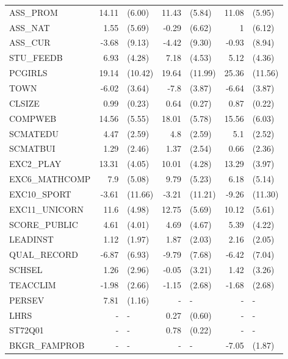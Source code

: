 \documentclass[10pt]{article}
\begin{document}
\begin{table}[H]
\begin{threeparttable}
\begin{tabular}{lrlrlrl}
				ASS\_PROM & 14.11 & (6.00) & 11.43 & (5.84) & 11.08 & (5.95) \\[0.2em]
				ASS\_NAT & 1.55  & (5.69) & -0.29 & (6.62) & 1     & (6.12) \\[0.2em]
				ASS\_CUR & -3.68 & (9.13) & -4.42 & (9.30) & -0.93 & (8.94) \\[0.2em]
				STU\_FEEDB & 6.93  & (4.28) & 7.18  & (4.53) & 5.12  & (4.36) \\[0.2em]
				PCGIRLS & 19.14 & (10.42) & 19.64 & (11.99) & 25.36 & (11.56) \\[0.2em]
				TOWN  & -6.02 & (3.64) & -7.8  & (3.87) & -6.64 & (3.87) \\[0.2em]
				CLSIZE & 0.99  & (0.23) & 0.64  & (0.27) & 0.87  & (0.22) \\[0.2em]
				COMPWEB & 14.56 & (5.55) & 18.01 & (5.78) & 15.56 & (6.03) \\[0.2em]
				SCMATEDU & 4.47  & (2.59) & 4.8   & (2.59) & 5.1   & (2.52) \\[0.2em]
				SCMATBUI & 1.29  & (2.46) & 1.37  & (2.54) & 0.66  & (2.36) \\[0.2em]
				EXC2\_PLAY & 13.31 & (4.05) & 10.01 & (4.28) & 13.29 & (3.97) \\[0.2em]
				EXC6\_MATHCOMP & 7.9   & (5.08) & 9.79  & (5.23) & 6.18  & (5.14) \\[0.2em]
				EXC10\_SPORT & -3.61 & (11.66) & -3.21 & (11.21) & -9.26 & (11.30) \\[0.2em]
				EXC11\_UNICORN & 11.6  & (4.98) & 12.75 & (5.69) & 10.12 & (5.61) \\[0.2em]
				SCORE\_PUBLIC & 4.61  & (4.01) & 4.69  & (4.67) & 5.39  & (4.22) \\[0.2em]
				LEADINST & 1.12  & (1.97) & 1.87  & (2.03) & 2.16  & (2.05) \\[0.2em]
				QUAL\_RECORD & -6.87 & (6.93) & -9.79 & (7.68) & -6.42 & (7.04) \\[0.2em]
				SCHSEL & 1.26  & (2.96) & -0.05 & (3.21) & 1.42  & (3.26) \\[0.2em]
				TEACCLIM & -1.98 & (2.66) & -1.15 & (2.68) & -1.68 & (2.68) \\[0.2em]
				PERSEV & 7.81  & (1.16) & -     & -     & -     & - \\[0.2em]
				LHRS  & -     & -     & 0.27  & (0.60) & -     & - \\[0.2em]
				ST72Q01 & -     & -     & 0.78  & (0.22) & -     & - \\[0.2em]
				BKGR\_FAMPROB & -     & -     & -     & -     & -7.05 & (1.87) \\[0.2em]

\end{tabular}
\end{threeparttable}
\end{table}
\end{document}
